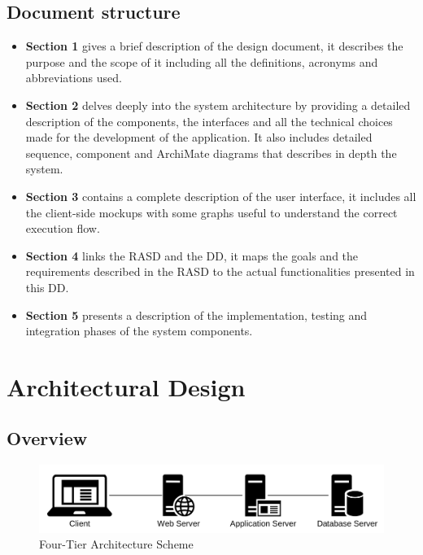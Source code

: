 \documentclass[table, 12pt]{article}
\begin{document}
\subsection{Document structure}
\begin{itemize}
    \item \textbf{Section 1} gives a brief description of the design document, it describes the purpose and the scope of it including all the definitions, acronyms and abbreviations used. 
    \item \textbf{Section 2} delves deeply into the system architecture by providing a detailed description of the components, the interfaces and all the technical choices made for the development of the application.
    It also includes detailed sequence, component and ArchiMate diagrams that describes in depth the system.
    \item \textbf{Section 3} contains a complete description of the user interface, it includes all the client-side mockups with some graphs useful to understand the correct execution flow.
    \item \textbf{Section 4} links the RASD and the DD, it maps the goals and the requirements described in the RASD to the actual functionalities presented in this DD.
    \item \textbf{Section 5} presents a description of the implementation, testing and integration phases of the system components.
\end{itemize}
\section{Architectural Design}


\subsection{Overview}
\begin{center}
    \begin{figure}[H]
        \includegraphics[scale=0.55, center]{assets/4-tier-scheme.jpg}
        \caption{Four-Tier Architecture Scheme}
        \label{fig: four-tier-architecture-scheme}
    \end{figure}
\end{center}
\end{document}
